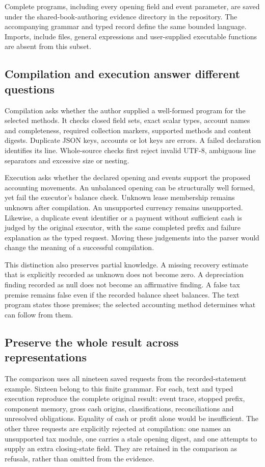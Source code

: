 Complete programs, including every opening field and event parameter, are
saved under the shared-book-authoring evidence directory in the repository.
The accompanying grammar and typed record define the same bounded language.
Imports, include files, general expressions and user-supplied executable
functions are absent from this subset.

\subsection{Compilation and execution answer different questions}

Compilation asks whether the author supplied a well-formed program for the
selected methods. It checks closed field sets, exact scalar types, account
names and completeness, required collection markers, supported methods and
content digests. Duplicate JSON keys, accounts or lot keys are errors.
A failed declaration identifies its line. Whole-source checks first reject
invalid UTF-8, ambiguous line separators and excessive size or nesting.

Execution asks whether the declared opening and events support the proposed
accounting movements. An unbalanced opening can be structurally well formed,
yet fail the executor's balance check. Unknown lease membership remains
unknown after compilation. An unsupported currency remains unsupported.
Likewise, a duplicate event identifier or a payment without sufficient cash
is judged by the original executor, with the same completed prefix and
failure explanation as the typed request. Moving these judgements into the
parser would change the meaning of a successful compilation.

This distinction also preserves partial knowledge. A missing recovery estimate
that is explicitly recorded as unknown does not become zero. A depreciation
finding recorded as null does not become an affirmative finding. A false tax
premise remains false even if the recorded balance sheet balances. The text
program states those premises; the selected accounting method determines
what can follow from them.

\subsection{Preserve the whole result across representations}

The comparison uses all nineteen saved requests from the recorded-statement
example. Sixteen belong to this finite grammar. For each, text and typed
execution reproduce the complete original result: event trace, stopped prefix,
component memory, gross cash origins, classifications, reconciliations and
unresolved obligations. Equality of cash or profit alone would be insufficient.
The other three requests are explicitly rejected at compilation: one names an
unsupported tax module, one carries a stale opening digest, and one attempts
to supply an extra closing-state field. They are retained in the comparison
as refusals, rather than omitted from the evidence.

